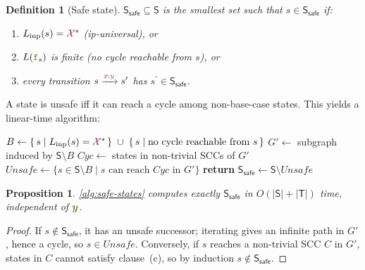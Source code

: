 \documentclass{article}
\newcommand{\RETURN}{\STATE \textbf{return} }
\newcommand{\mymacro}[1]{#1}
\newcommand{\srcSym}{{\color{TokenColor}x}}
\newcommand{\tgtSym}{{\color{CharacterColor}y}}
\newcommand{\tgtStr}{{\color{CharacterColor}\boldsymbol{y}}}
\newcommand{\srcAlphabet}[0]{{\color{TokenColor}\ensuremath{\mathcal{X}}}\xspace}
\newcommand{\srcStrings}[0]{\ensuremath{\srcAlphabet^*}\xspace}
\newcommand{\transST}{{\color{CharacterColor}\texttt{f}}}
\newcommand{\States}{\mymacro{\mathsf{S}}}
\newcommand{\Transitions}{\mymacro{\mathsf{T}}}
\newcommand{\state}{\mymacro{s}}
\newcommand{\statep}{\mymacro{s^\prime}}
\newcommand{\SafeStates}{\States_{\mathsf{safe}}}
\theoremstyle{plain}
\newtheorem{proposition}[theorem]{Proposition}
\newtheorem{definition}[theorem]{Definition}
\begin{document}
\begin{definition}[Safe state]
\label{def:safe-state}
$\SafeStates \subseteq \States$ is the smallest set such that $\state \in \SafeStates$ if:
\begin{enumerate}[label=(\alph*)]
\item $L_{\mathrm{inp}}(\state) = \srcStrings$ \quad (ip-universal), or
\item $L(\transST_\state)$ is finite \quad (no cycle reachable from $\state$), or
\item every transition $\state \xrightarrow{\srcSym:\tgtSym} \statep$ has $\statep \in \SafeStates$.
\end{enumerate}
\end{definition}

A state is unsafe iff it can reach a cycle among non-base-case states.  This yields a linear-time algorithm:

\begin{algorithm}[ht]
\caption{$\textsc{ComputeSafeStates}(\transST)$}
\label{alg:safe-states}
\begin{algorithmic}[1]
\STATE $B \leftarrow \{\, \state \mid L_{\mathrm{inp}}(\state) = \srcStrings \,\}
  \;\cup\; \{\, \state \mid \text{no cycle reachable from } \state \,\}$
  \hfill{}
\STATE $G' \leftarrow$ subgraph induced by $\States \setminus B$
\STATE $\mathit{Cyc} \leftarrow$ states in non-trivial SCCs of $G'$
  \hfill{}
\STATE $\mathit{Unsafe} \leftarrow \{ \state \in \States \setminus B \mid
  \state \text{ can reach } \mathit{Cyc} \text{ in } G' \}$
  \hfill{}
\RETURN $\SafeStates \leftarrow \States \setminus \mathit{Unsafe}$
\end{algorithmic}
\end{algorithm}

\begin{proposition}
\label{prop:safe-states}
\cref{alg:safe-states} computes exactly $\SafeStates$ in $O(|\States| + |\Transitions|)$ time,
independent of $\tgtStr$.
\end{proposition}
\begin{proof}
If $\state \notin \SafeStates$, it has an unsafe successor; iterating gives an
infinite path in $G'$, hence a cycle, so $\state \in \mathit{Unsafe}$.
Conversely, if $\state$ reaches a non-trivial SCC $C$ in $G'$, states in $C$
cannot satisfy clause~(c), so by induction $\state \notin \SafeStates$.
\end{proof}


\end{document}

